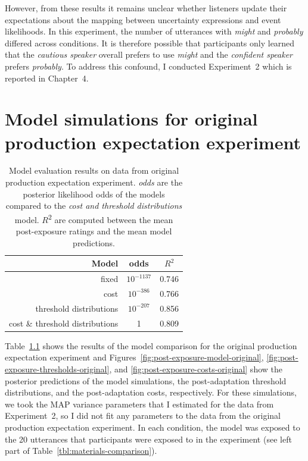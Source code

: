 However, from these results it remains unclear whether listeners update their expectations about the mapping between uncertainty expressions and event likelihoods. In this experiment, the number of utterances with \textit{might} and \textit{probably} differed across conditions. It is therefore possible that participants only learned that the {\it cautious speaker} overall prefers to use {\it might} and the {\it confident speaker} prefers {\it probably}. To address this confound, I conducted Experiment~2 which is reported in Chapter~4. 

\chapter[Original adaptation experiment simulations]{Model simulations for original production expectation experiment}


\begin{table}
\center
\begin{tabular}{r | c | c }
Model &   odds  &  $R^2$ \\ \midrule
fixed & $10^{-1137}$ &  0.746       \\
cost & $10^{-386}$ & 0.766     \\
threshold distributions & $10^{-207}$ &  0.856 \\
cost \& threshold distributions & 1 &  0.809 \\
\end{tabular}
\caption{Model evaluation results on data from original production expectation experiment.   \textit{odds} are the posterior likelihood odds of the models compared to the \textit{cost and threshold distributions} model.  $R$\textsuperscript{$2$} are computed between  the mean post-exposure ratings and the mean model predictions. \label{tbl:model-comparison-orig}}
\end{table}


Table~\ref{tbl:model-comparison-orig} shows the results of the model comparison  for the original production expectation experiment and  Figures~\ref{fig:post-exposure-model-original}, \ref{fig:post-exposure-thresholds-original}, and \ref{fig:post-exposure-costs-original} show the posterior predictions
of the model simulations, the post-adaptation threshold distributions, and the post-adaptation costs, respectively. For these simulations, we took the MAP variance parameters that I estimated for the data from Experiment~2, so I did not fit any parameters to the data from the original production expectation experiment. In each condition, the model was exposed to the 20 utterances that participants were exposed to in the experiment (see left part of Table~\ref{tbl:materials-comparison}).

